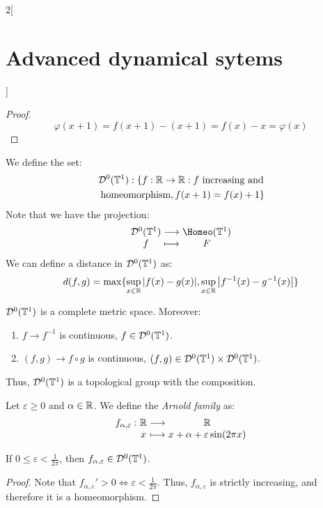 \documentclass[../../../main_math.tex]{subfiles}
\begin{document}
\begin{multicols}{2}[\section{Advanced dynamical sytems}]
\begin{proof}
    $$
      \varphi(x+1)=f(x+1)-(x+1)=f(x)-x=\varphi(x)
    $$
  \end{proof}
  \begin{definition}
    We define the set:
    \begin{multline*}
      \mathcal{D}^0(\mathbb{T}^1):\{f:\mathbb{R}\to\mathbb{R}:f\text{ increasing and}\\
      \text{ homeomorphism}, f(x+1)=f(x)+1\}
    \end{multline*}
    Note that we have the projection:
    $$
      \function{}{\mathcal{D}^0(\TT^1)}{\Homeo(\TT^1)}{f}{F}
    $$
    We can define a distance in $\mathcal{D}^0(\mathbb{T}^1)$ as:
    $$
      d(f,g)=\max\{ \sup_{x\in\mathbb{R}}\abs{f(x)-g(x)},\sup_{x\in\mathbb{R}}\abs{f^{-1}(x)-g^{-1}(x)}\}
    $$
  \end{definition}
  \begin{lemma}
    $\mathcal{D}^0(\mathbb{T}^1)$ is a complete metric space. Moreover:
    \begin{enumerate}
      \item $f\to f^{-1}$ is continuous, $f\in \mathcal{D}^0(\mathbb{T}^1)$.
      \item $(f,g)\to f\circ g$ is continuous, $(f,g)\in \mathcal{D}^0(\mathbb{T}^1)\times \mathcal{D}^0(\mathbb{T}^1)$.
    \end{enumerate}
    Thus, $\mathcal{D}^0(\mathbb{T}^1)$ is a topological group with the composition.
  \end{lemma}
  \begin{definition}
    Let $\varepsilon\geq 0$ and $\alpha\in\mathbb{R}$. We define the \emph{Arnold family} as:
    $$
      \function{f_{\alpha,\varepsilon}}{\RR}{\RR}{x}{x+\alpha+\varepsilon\sin(2\pi x)}
    $$
  \end{definition}
  \begin{lemma}
    If $0\leq \varepsilon<\frac{1}{2\pi}$, then $f_{\alpha,\varepsilon}\in \mathcal{D}^0(\mathbb{T}^1)$.
  \end{lemma}
  \begin{proof}
    Note that ${f_{\alpha,\varepsilon}}'>0\iff \varepsilon<\frac{1}{2\pi}$. Thus, $f_{\alpha,\varepsilon}$ is strictly increasing, and therefore it is a homeomorphism.
  \end{proof}

\end{multicols}
\end{document}
